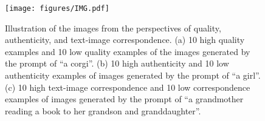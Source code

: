 \begin{figure}[t]
  \centering
  \texttt{[image: figures/IMG.pdf]}
  \caption{Illustration of the images from the perspectives of quality, authenticity, and text-image correspondence.
  (a)  10 high quality examples
and 10 low quality examples of the images generated by the prompt of “a corgi”.
  (b)  10 high authenticity and
10 low authenticity examples of images generated by the prompt of “a girl”.
  (c)  10 high text-image correspondence and 10 low correspondence
examples of images generated by the prompt of “a grandmother reading a book
to her grandson and granddaughter”.
}

\end{figure}